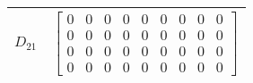 \begin{tabular}{cl}
 $D_{21}$ & $\left[\begin{matrix}0 & 0 & 0 & 0 & 0 & 0 & 0 & 0 & 0\\0 & 0 & 0 & 0 & 0 & 0 & 0 & 0 & 0\\0 & 0 & 0 & 0 & 0 & 0 & 0 & 0 & 0\\0 & 0 & 0 & 0 & 0 & 0 & 0 & 0 & 0\end{matrix}\right]$                                                                                                                                                                                                                                                                 \\
\hline
\end{tabular}